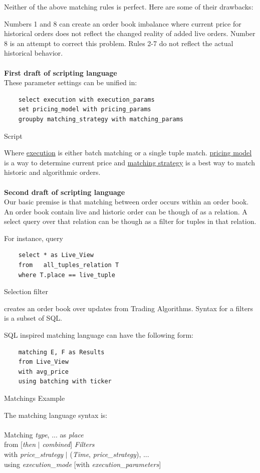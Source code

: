 \documentclass{article}
\begin{document}
Neither of the above matching rules is perfect. Here are some of their drawbacks:

Numbers 1 and 8 can create an order book imbalance where current price for historical orders does not reflect the changed reality of added live orders. Number 8 is an attempt to correct this problem. Rules 2-7 do not reflect the actual historical behavior. 
\\
\\
{\bf First draft of scripting language}
\\
These parameter settings can be unified in:
\begin{program}
    \begin{verbatim}
    select execution with execution_params
    set pricing_model with pricing_params
    groupby matching_strategy with matching_params
    \end{verbatim}
    \caption{Script}
\end{program}  

Where \underline{execution} is either batch matching or a single tuple match. \underline{pricing model} is a way to determine current price and \underline{matching strategy} is a best way to match historic and algorithmic orders.
\\
\\
{\bf Second draft of scripting language}
\\
Our basic premise is that matching between order occurs within an order book. An order book contain live and historic order can be though of as a relation. A select query over that relation can be though as a filter for tuples in that relation.

For instance, query 

\begin{program}
    \begin{verbatim}
    select * as Live_View
    from   all_tuples_relation T
    where T.place == live_tuple
    \end{verbatim}
    \caption{Selection filter}
\end{program}

\noindent creates an order book over updates from Trading Algorithms. Syntax for a filters is a subset of SQL. 

SQL inspired matching language can have the following form:

\begin{program}
    \begin{verbatim}
    matching E, F as Results
    from Live_View
    with avg_price
    using batching with ticker
    \end{verbatim}
    \caption{Matchings Example}
\end{program}

The matching language syntax is:
\\
\\
Matching \emph{type}, ... as \emph{place} \\
from [\emph{then} $\vert$ \emph{combined}] \emph{Filters} \\
with \emph{price\_strategy} $\vert$ (\emph{Time}, \emph{price\_strategy}), ...\\
using \emph{execution\_mode} [with \emph{execution\_parameters}]
\end{document}
